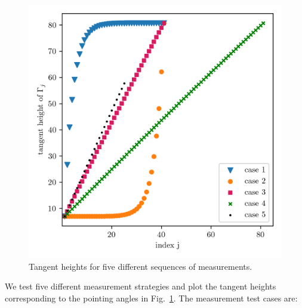 \begin{figure}[ht!]
	\centering
	\includegraphics{MeasTangHeight.png}
	\caption[Tangent heights for different sequences of measurements.]{Tangent heights for five different sequences of measurements.}
	\label{fig:TangHCases}
\end{figure}
We test five different measurement strategies and plot the tangent heights corresponding to the pointing angles in Fig.~\ref{fig:TangHCases}.
The measurement test cases are:
